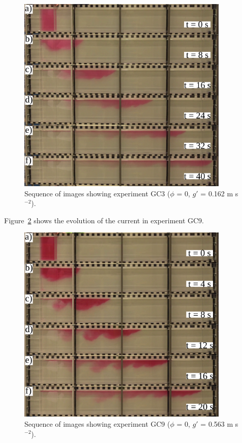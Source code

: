 \documentclass[authoryear,preprint,review,12pt]{elsarticle}
\begin{document}
\begin{figure}[ht!]
  \centerline{\includegraphics[width=0.9\textwidth]{GC3.pdf}}
  \caption{Sequence of images showing experiment GC3 ($\phi$ = 0, $g\prime$ = 0.162 m s$^{-2}$). }
  \label{fig:GC3}
\end{figure}

Figure~\ref{fig:GC9} shows the evolution of the current in experiment GC9.

\begin{figure}[ht!]
  \centerline{\includegraphics[width=0.9\textwidth]{GC9.pdf}}
  \caption{Sequence of images showing experiment GC9 ($\phi$ = 0, $g\prime$ = 0.563 m s$^{-2}$). }
  \label{fig:GC9}
\end{figure}
\end{document}
